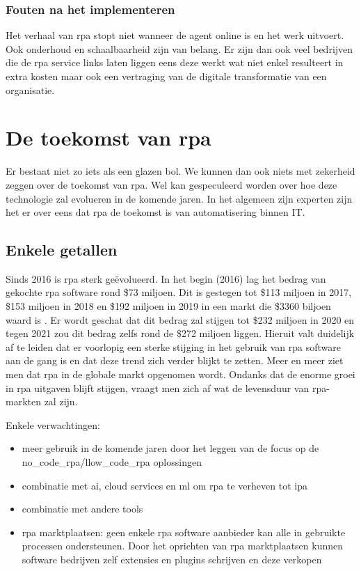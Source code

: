 \subsubsection{Fouten na het implementeren}
Het verhaal van \acrshort{rpa} stopt niet wanneer de agent online is en het werk uitvoert. Ook onderhoud en schaalbaarheid zijn van belang. Er zijn dan ook veel bedrijven die de \acrshort{rpa} service links laten liggen eens deze werkt wat niet enkel resulteert in extra kosten maar ook een vertraging van de digitale transformatie van een organisatie. \autocite{pitfallsRPA}

\section{De toekomst van \acrshort{rpa}}
Er bestaat niet zo iets als een glazen bol. We kunnen dan ook niets met zekerheid zeggen over de toekomst van \acrshort{rpa}. Wel kan gespeculeerd worden over hoe deze technologie zal evolueren in de komende jaren. In het algemeen zijn experten zijn het er over eens dat \acrshort{rpa} de toekomst is van automatisering binnen IT. \autocite{futRPA}

\subsection{Enkele getallen}
Sinds 2016 is \acrshort{rpa} sterk geëvolueerd. In het begin (2016) lag het bedrag van gekochte \acrshort{rpa} software rond \$73 miljoen. Dit is gestegen tot \$113 miljoen in 2017, \$153 miljoen in 2018 en \$192 miljoen in 2019 in een markt die \$3360 biljoen waard is \autocite{ITMarktValue}. Er wordt geschat dat dit bedrag zal stijgen tot \$232 miljoen in 2020 en tegen 2021 zou dit bedrag zelfs rond de \$272 miljoen liggen. Hieruit valt duidelijk af te leiden dat er voorlopig een sterke stijging in het gebruik van \acrshort{rpa} software aan de gang is en dat deze trend zich verder blijkt te zetten. Meer en meer ziet men dat \acrshort{rpa} in de globale markt opgenomen wordt. \autocite{futRPA} Ondanks dat de enorme groei in \acrshort{rpa} uitgaven blijft stijgen, vraagt men zich af wat de levensduur van \acrshort{rpa}-markten zal zijn. \autocite{everythingRPA}

Enkele verwachtingen:
\begin{itemize}
	\item meer gebruik in de komende jaren door het leggen van de focus op de \gls{no_code_rpa}/l\gls{low_code_rpa} oplossingen 
	\item combinatie met \acrshort{ai}, cloud services en \acrshort{ml} om \acrshort{rpa} te verheven tot \acrshort{ipa}
	\item combinatie met andere tools
	\item \acrshort{rpa} marktplaatsen: geen enkele \acrshort{rpa} software aanbieder kan alle in gebruikte processen ondersteunen. Door het oprichten van \acrshort{rpa} marktplaatsen kunnen software bedrijven zelf extensies en plugins schrijven en deze verkopen
\end{itemize} \autocite{futureRPA}\autocite{everythingRPA}

